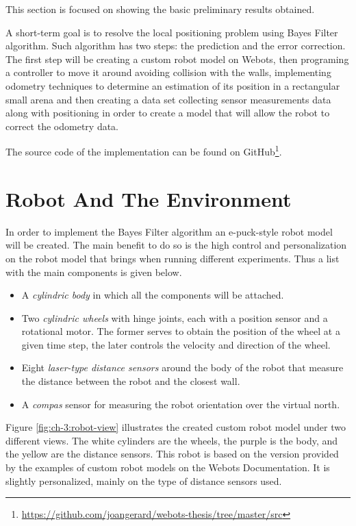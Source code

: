 This section is focused on showing the basic preliminary results obtained. 

A short-term goal is to resolve the local positioning problem using Bayes Filter algorithm. Such algorithm has two steps: the prediction and the error correction. The first step will be creating a custom robot model on Webots, then programing a controller to move it around avoiding collision with the walls, implementing odometry techniques to determine an estimation of its position in a rectangular small arena and then creating a data set collecting sensor measurements data along with positioning in order to create a model that will allow the robot to correct the odometry data. 

The source code of the implementation can be found on GitHub\footnote{\hyperref[here]{https://github.com/joangerard/webots-thesis/tree/master/src}}.

\section{Robot And The Environment}

In order to implement the Bayes Filter algorithm an e-puck-style robot model will be created. The main benefit to do so is the high control and personalization on the robot model that brings when running different experiments. Thus a list with the main components is given below.

\begin{itemize}
\item A \textit{cylindric body} in which all the components will be attached. 
\item Two \textit{cylindric wheels} with hinge joints, each with a position sensor and a rotational motor. The former serves to obtain the position of the wheel at a given time step, the later controls the velocity and direction of the wheel.
\item Eight \textit{laser-type distance sensors} around the body of the robot that measure the distance between the robot and the closest wall.
\item A \textit{compas} sensor for measuring the robot orientation over the virtual north.
\end{itemize}

Figure \ref{fig:ch-3:robot-view} illustrates the created custom robot model under two different views. The white cylinders are the wheels, the purple is the body, and the yellow are the distance sensors. This robot is based on the version provided by the examples of custom robot models on the Webots Documentation. It is slightly personalized, mainly on the type of distance sensors used.


